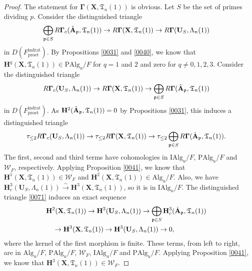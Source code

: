 \documentclass{amsart}
\theoremstyle{remark}
\numberwithin{equation}{section}
\newcommand{\isomto}{\overset{\sim}{\to}}
\newcommand{\et}{\mathrm{et}}
\newcommand{\rat}{\mathrm{rat}}
\newcommand{\ind}{\mathrm{ind}}
\newcommand{\pro}{\mathrm{pro}}
\newcommand{\Alg}{\mathrm{Alg}}
\newcommand{\Ind}{\mathrm{I}}
\newcommand{\Pro}{\mathrm{P}}
\newcommand{\alg}[1]{\mathbf{#1}}
\newcommand{\ideal}[1]{\mathfrak{#1}}
\begin{document}
\begin{proof}
	The statement for $\alg{\Gamma}(\alg{X}, \mathfrak{T}_{n}(1))$ is obvious.
	Let $S$ be the set of primes dividing $p$.
	Consider the distinguished triangle
		\begin{equation} \label{0071}
				\bigoplus_{\ideal{p} \in S}
					R \alg{\Gamma}_{c}(\Hat{\alg{A}}_{\ideal{p}}, \mathfrak{T}_{n}(1))
			\to
				R \alg{\Gamma}(\alg{X}, \mathfrak{T}_{n}(1))
			\to
				R \alg{\Gamma}(\alg{U}_{S}, \Lambda_{n}(1))
		\end{equation}
	in $D(F^{\ind\rat}_{\pro\et})$.
	By Propositions \ref{0031} and \ref{0040},
	we know that $\alg{H}^{q}(\alg{X}, \mathfrak{T}_{n}(1)) \in \Pro \Alg_{u} / F$
	for $q = 1$ and $2$ and zero for $q \ne 0, 1, 2, 3$.
	Consider the distinguished triangle
		\[
				R \alg{\Gamma}_{c}(\alg{U}_{S}, \Lambda_{n}(1))
			\to
				R \alg{\Gamma}(\alg{X}, \mathfrak{T}_{n}(1))
			\to
				\bigoplus_{\ideal{p} \in S}
					R \alg{\Gamma}(\Hat{\alg{A}}_{\ideal{p}}, \mathfrak{T}_{n}(1))
		\]
	in $D(F^{\ind\rat}_{\pro\et})$.
	As $\alg{H}^{2}(\Hat{\alg{A}}_{\ideal{p}}, \mathfrak{T}_{n}(1)) = 0$
	by Propositions \ref{0031},
	this induces a distinguished triangle
		\[
				\tau_{\le 2}
				R \alg{\Gamma}_{c}(\alg{U}_{S}, \Lambda_{n}(1))
			\to
				\tau_{\le 2}
				R \alg{\Gamma}(\alg{X}, \mathfrak{T}_{n}(1))
			\to
				\tau_{\le 2}
				\bigoplus_{\ideal{p} \in S}
					R \alg{\Gamma}(\Hat{\alg{A}}_{\ideal{p}}, \mathfrak{T}_{n}(1)).
		\]
	The first, second and third terms have cohomologies in
	$\Ind \Alg_{u} / F$, $\Pro \Alg_{u} / F$ and $\mathcal{W}_{F}$, respectively.
	Applying Proposition \ref{0041}, we know that
	$\alg{H}^{1}(\alg{X}, \mathfrak{T}_{n}(1)) \in \mathcal{W}_{F}$
	and $\alg{H}^{2}(\alg{X}, \mathfrak{T}_{n}(1)) \in \Alg_{u} / F$.
	Also, we have $\alg{H}_{c}^{3}(\alg{U}_{S}, \Lambda_{n}(1)) \isomto \alg{H}^{3}(\alg{X}, \mathfrak{T}_{n}(1))$,
	so it is in $\Ind \Alg_{u} / F$.
	The distinguished triangle \eqref{0071} induces an exact sequence
		\begin{align*}
			&
					\alg{H}^{2}(\alg{X}, \mathfrak{T}_{n}(1))
				\to
					\alg{H}^{2}(\alg{U}_{S}, \Lambda_{n}(1))
				\to
					\bigoplus_{\ideal{p} \in S}
						\alg{H}^{3}_{c}(\Hat{\alg{A}}_{\ideal{p}}, \mathfrak{T}_{n}(1))
			\\
			& \quad
				\to
					\alg{H}^{3}(\alg{X}, \mathfrak{T}_{n}(1))
				\to
					\alg{H}^{3}(\alg{U}_{S}, \Lambda_{n}(1))
				\to
					0,
		\end{align*}
	where the kernel of the first morphism is finite.
	These terms, from left to right, are in
	$\Alg_{u} / F$, $\Pro \Alg_{u} / F$, $\mathcal{W}_{F}$,
	$\Ind \Alg_{u} / F$ and $\Pro \Alg_{u} / F$.
	Applying Proposition \ref{0041}, we know that
	$\alg{H}^{3}(\alg{X}, \mathfrak{T}_{n}(1)) \in \mathcal{W}_{F}$.
\end{proof}
\end{document}
